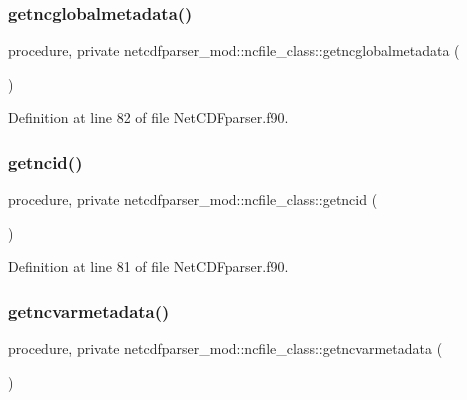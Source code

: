\subsubsection{\texorpdfstring{getncglobalmetadata()}{getncglobalmetadata()}}
{\footnotesize\ttfamily procedure, private netcdfparser\+\_\+mod\+::ncfile\+\_\+class\+::getncglobalmetadata (\begin{DoxyParamCaption}{ }\end{DoxyParamCaption})\hspace{0.3cm}{\ttfamily [private]}}



Definition at line 82 of file Net\+C\+D\+Fparser.\+f90.

\mbox{\label{structnetcdfparser__mod_1_1ncfile__class_a78eb48e6493c1f48f44b89517addf2bc}} 
\subsubsection{\texorpdfstring{getncid()}{getncid()}}
{\footnotesize\ttfamily procedure, private netcdfparser\+\_\+mod\+::ncfile\+\_\+class\+::getncid (\begin{DoxyParamCaption}{ }\end{DoxyParamCaption})\hspace{0.3cm}{\ttfamily [private]}}



Definition at line 81 of file Net\+C\+D\+Fparser.\+f90.

\mbox{\label{structnetcdfparser__mod_1_1ncfile__class_a87e2ab9be12dd33782a39be6103c05b4}} 
\subsubsection{\texorpdfstring{getncvarmetadata()}{getncvarmetadata()}}
{\footnotesize\ttfamily procedure, private netcdfparser\+\_\+mod\+::ncfile\+\_\+class\+::getncvarmetadata (\begin{DoxyParamCaption}{ }\end{DoxyParamCaption})\hspace{0.3cm}{\ttfamily [private]}}



